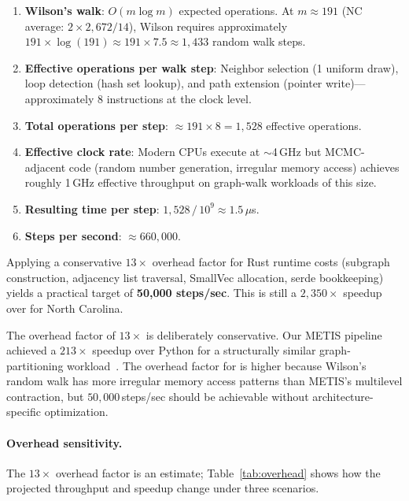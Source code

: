 \begin{enumerate}
  \item \textbf{Wilson's walk}: $O(m\log m)$ expected operations.
    At $m \approx 191$ (NC average: $2 \times 2{,}672 / 14$),
    Wilson requires approximately $191 \times \log(191) \approx 191 \times 7.5 \approx 1{,}433$
    random walk steps.
  \item \textbf{Effective operations per walk step}: Neighbor selection
    (1 uniform draw), loop detection (hash set lookup), and
    path extension (pointer write)---approximately 8 instructions at the
    clock level.
  \item \textbf{Total operations per \recom{} step}: $\approx 191 \times 8 = 1{,}528$
    effective operations.
  \item \textbf{Effective clock rate}: Modern CPUs execute at
    $\sim$4\,GHz but MCMC-adjacent code (random number generation,
    irregular memory access) achieves roughly 1\,GHz effective throughput
    on graph-walk workloads of this size.
  \item \textbf{Resulting time per step}: $1{,}528 \,/\, 10^9 \approx 1.5\,\mu$s.
  \item \textbf{Steps per second}: $\approx 660{,}000$.
\end{enumerate}

Applying a conservative $13\times$ overhead factor for Rust runtime costs
(subgraph construction, adjacency list traversal, SmallVec allocation,
serde bookkeeping) yields a practical target of \textbf{50{,}000 steps/sec}.
This is still a $2{,}350\times$ speedup over \gc{} for North Carolina.

\begin{remark}
The overhead factor of $13\times$ is deliberately conservative.
Our METIS pipeline achieved a $213\times$ speedup over Python for a
structurally similar graph-partitioning workload~\citep{dellaLibera2026b1}.
The overhead factor for \re{} is higher because Wilson's random walk has
more irregular memory access patterns than METIS's multilevel contraction,
but $50{,}000$\,steps/sec should be achievable without architecture-specific
optimization.
\end{remark}

\paragraph{Overhead sensitivity.}
The $13\times$ overhead factor is an estimate; Table~\ref{tab:overhead}
shows how the projected throughput and speedup change under three scenarios.

